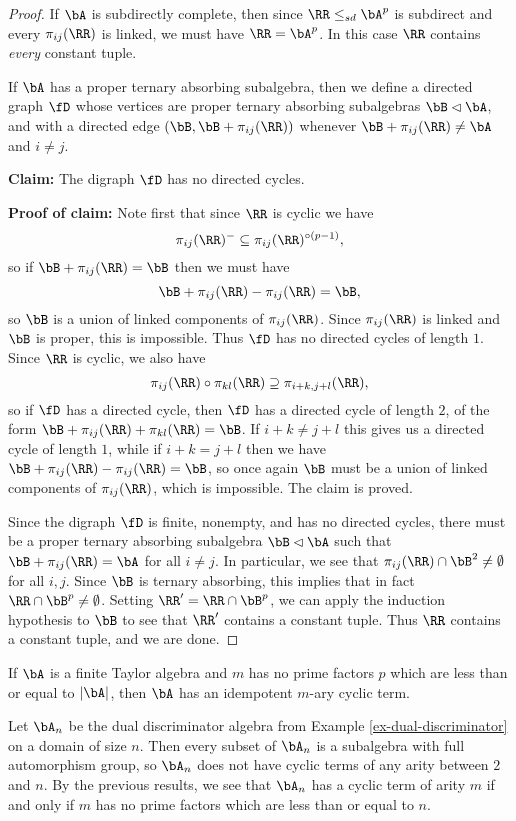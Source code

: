 \begin{proof}
If $\bA$ is subdirectly complete, then since $\RR \le_{sd} \bA^p$ is subdirect and every $\pi_{ij}(\RR)$ is linked, we must have $\RR = \bA^p$. In this case $\RR$ contains \emph{every} constant tuple.

If $\bA$ has a proper ternary absorbing subalgebra, then we define a directed graph $\fD$ whose vertices are proper ternary absorbing subalgebras $\bB \lhd \bA$, and with a directed edge $(\bB, \bB+\pi_{ij}(\RR))$ whenever $\bB + \pi_{ij}(\RR) \ne \bA$ and $i \ne j$.

{\bf Claim:} The digraph $\fD$ has no directed cycles.

{\bf Proof of claim:} Note first that since $\RR$ is cyclic we have
\[
\pi_{ij}(\RR)^- \subseteq \pi_{ij}(\RR)^{\circ (p-1)},
\]
so if $\bB + \pi_{ij}(\RR) = \bB$ then we must have
\[
\bB + \pi_{ij}(\RR) - \pi_{ij}(\RR) = \bB,
\]
so $\bB$ is a union of linked components of $\pi_{ij}(\RR)$. Since $\pi_{ij}(\RR)$ is linked and $\bB$ is proper, this is impossible. Thus $\fD$ has no directed cycles of length $1$. Since $\RR$ is cyclic, we also have
\[
\pi_{ij}(\RR)\circ \pi_{kl}(\RR) \supseteq \pi_{i+k,j+l}(\RR),
\]
so if $\fD$ has a directed cycle, then $\fD$ has a directed cycle of length $2$, of the form $\bB + \pi_{ij}(\RR) + \pi_{kl}(\RR) = \bB$. If $i+k \ne j+l$ this gives us a directed cycle of length $1$, while if $i+k = j+l$ then we have $\bB + \pi_{ij}(\RR) - \pi_{ij}(\RR) = \bB$, so once again $\bB$ must be a union of linked components of $\pi_{ij}(\RR)$, which is impossible. The claim is proved.

Since the digraph $\fD$ is finite, nonempty, and has no directed cycles, there must be a proper ternary absorbing subalgebra $\bB \lhd \bA$ such that $\bB + \pi_{ij}(\RR) = \bA$ for all $i \ne j$. In particular, we see that $\pi_{ij}(\RR) \cap \bB^2 \ne \emptyset$ for all $i,j$. Since $\bB$ is ternary absorbing, this implies that in fact $\RR \cap \bB^p \ne \emptyset$. Setting $\RR' = \RR \cap \bB^p$, we can apply the induction hypothesis to $\bB$ to see that $\RR'$ contains a constant tuple. Thus $\RR$ contains a constant tuple, and we are done.
\end{proof}

\begin{cor} If $\bA$ is a finite Taylor algebra and $m$ has no prime factors $p$ which are less than or equal to $|\bA|$, then $\bA$ has an idempotent $m$-ary cyclic term.
\end{cor}

\begin{ex} Let $\bA_n$ be the dual discriminator algebra from Example \ref{ex-dual-discriminator} on a domain of size $n$. Then every subset of $\bA_n$ is a subalgebra with full automorphism group, so $\bA_n$ does not have cyclic terms of any arity between $2$ and $n$. By the previous results, we see that $\bA_n$ has a cyclic term of arity $m$ if and only if $m$ has no prime factors which are less than or equal to $n$.
\end{ex}

